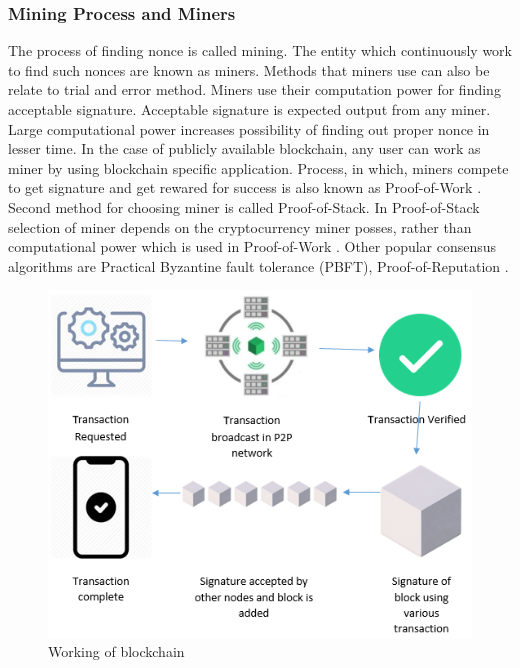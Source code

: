 \documentclass[a4paper,twoside,12pt]{report}
\begin{document}
\begin{spacing}{1.5}
\subsubsection{Mining Process and Miners}
\label{miningprocess}
The process of finding nonce is called mining. The entity which continuously work to find such nonces are known as miners. Methods that miners use can also be relate to trial and error method. Miners use their computation power for finding acceptable signature. Acceptable signature is expected output from any miner. Large computational power increases possibility of finding out proper nonce in lesser time. In the case of publicly available blockchain, any user can work as miner by using blockchain specific application. Process, in which, miners compete to get signature and get rewared for success is also known as Proof-of-Work \cite{satoshinakamoto}. Second method for choosing miner is called Proof-of-Stack. In Proof-of-Stack selection of miner depends on the cryptocurrency miner posses, rather than computational power which is used in Proof-of-Work \cite{saad_exploring_2019}. Other popular consensus algorithms are Practical Byzantine fault tolerance (PBFT), Proof-of-Reputation \cite{saad_exploring_2019}.
\begin{figure}[h!]
\begin{center}
  \includegraphics[width=0.8\linewidth]{images/workingofblockchain.png}
  \caption{\fontsize{10}{10}\selectfont Working of blockchain}
  \label{img: workingofblockchain}
\end{center}
\end{figure}  

\end{spacing}
\end{document}
